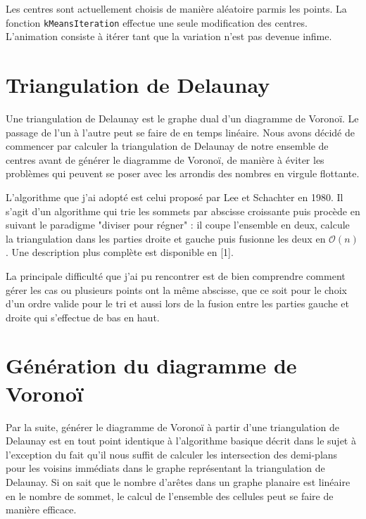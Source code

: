 \documentclass[a4paper]{article}
\begin{document}
Les centres sont actuellement choisis de manière aléatoire parmis les points. La fonction \verb|kMeansIteration| effectue une seule modification des centres. L'animation consiste à itérer tant que la variation n'est pas devenue infime.

\section{Triangulation de Delaunay}

Une triangulation de Delaunay est le graphe dual d'un diagramme de Voronoï. Le passage de l'un à l'autre peut se faire de en temps linéaire. Nous avons décidé de commencer par calculer la triangulation de Delaunay de notre ensemble de centres avant de générer le diagramme de Voronoï, de manière à éviter les problèmes qui peuvent se poser avec les arrondis des nombres en virgule flottante.

L'algorithme que j'ai adopté est celui proposé par Lee et Schachter en 1980. Il s'agit d'un algorithme qui trie les sommets par abscisse croissante puis procède en suivant le paradigme "diviser pour régner" : il coupe l'ensemble en deux, calcule la triangulation dans les parties droite et gauche puis fusionne les deux en $\mathcal O(n)$. Une description plus complète est disponible en [1].

La principale difficulté que j'ai pu rencontrer est de bien comprendre comment gérer les cas ou plusieurs points ont la même abscisse, que ce soit pour le choix d'un ordre valide pour le tri et aussi lors de la fusion entre les parties gauche et droite qui s'effectue de bas en haut.

\section{Génération du diagramme de Voronoï}

Par la suite, générer le diagramme de Voronoï à partir d'une triangulation de Delaunay est en tout point identique à l'algorithme basique décrit dans le sujet à l'exception du fait qu'il nous suffit de calculer les intersection des demi-plans pour les voisins immédiats dans le graphe représentant la triangulation de Delaunay. Si on sait que le nombre d'arêtes dans un graphe planaire est linéaire en le nombre de sommet, le calcul de l'ensemble des cellules peut se faire de manière efficace.
\end{document}
